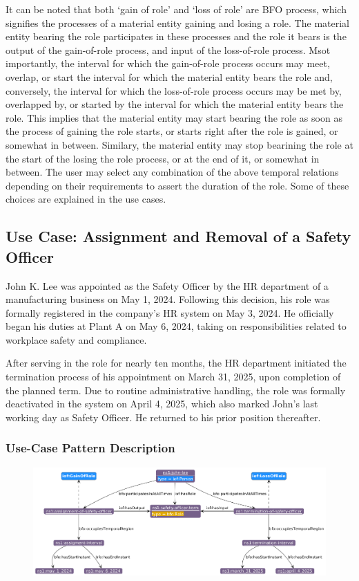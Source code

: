 It can be noted that both `gain of role' and `loss of role' are BFO process, which signifies the processes of a material entity gaining and losing a role. The material entity bearing the role participates in these processes and the role it bears is the output of the gain-of-role process, and input of the loss-of-role process. Msot importantly, the interval for which the gain-of-role process occurs may meet, overlap, or start the interval for which the material entity bears the role and, conversely, the interval for which the loss-of-role process occurs may be met by, overlapped by, or started by the interval for which the material entity bears the role. This implies that the material entity may start bearing the role as soon as the process of gaining the role starts, or starts right after the role is gained, or somewhat in between. Similary, the material entity may stop bearining the role at the start of the losing the role process, or at the end of it, or somewhat in between. The user may select any combination of the above temporal relations depending on their requirements to assert the duration of the role. Some of these choices are explained in the use cases. 


\subsection*{Use Case: Assignment and Removal of a Safety Officer}

John K. Lee was appointed as the Safety Officer by the HR department of a manufacturing business on May 1, 2024. Following this decision, his role was formally registered in the company’s HR system on May 3, 2024. He officially began his duties at Plant A on May 6, 2024, taking on responsibilities related to workplace safety and compliance.

After serving in the role for nearly ten months, the HR department initiated the termination process of his appointment on March 31, 2025, upon completion of the planned term. Due to routine administrative handling, the role was formally deactivated in the system on April 4, 2025, which also marked John’s last working day as Safety Officer. He returned to his prior position thereafter.

\subsubsection*{Use-Case Pattern Description}

\begin{figure}[ht]
    \centering
    \includegraphics[scale=0.35]{scenarios/role-gain-loss/images/use-case1.png}
    \label{fig:role-gain-loss-gp}
\end{figure}

